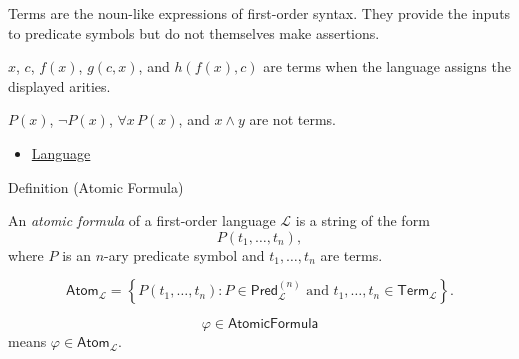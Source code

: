 \begin{remark*}[Interpretation]
Terms are the noun-like expressions of first-order syntax. They provide the
inputs to predicate symbols but do not themselves make assertions.
\end{remark*}

\begin{remark*}[Examples]
\(x\), \(c\), \(f(x)\), \(g(c,x)\), and \(h(f(x),c)\) are terms when the
language assigns the displayed arities.
\end{remark*}

\begin{remark*}
\(P(x)\), \(\neg P(x)\), \(\forall x\,P(x)\), and \(x\land y\) are not terms.
\end{remark*}

\begin{dependencies}
\begin{itemize}
  \item \hyperref[def:language]{Language}
\end{itemize}
\end{dependencies}

\begin{definitionbox}{Definition (Atomic Formula)}
\begin{definition}
\label{def:atomic-formula}
An \emph{atomic formula} of a first-order language \(\mathcal L\) is a string
of the form
\[
P(t_1,\ldots,t_n),
\]
where \(P\) is an \(n\)-ary predicate symbol and
\(t_1,\ldots,t_n\) are terms.
\end{definition}
\end{definitionbox}

\begin{remark*}
\[
\mathsf{Atom}_{\mathcal L}
=
\left\{
P(t_1,\ldots,t_n):
P\in\mathsf{Pred}_{\mathcal L}^{(n)}
\text{ and }
t_1,\ldots,t_n\in\mathsf{Term}_{\mathcal L}
\right\}.
\]
\end{remark*}

\begin{remark*}
\[
  \varphi\in\mathsf{AtomicFormula}
\] means
\(\varphi\in\mathsf{Atom}_{\mathcal L}\).
\end{remark*}

